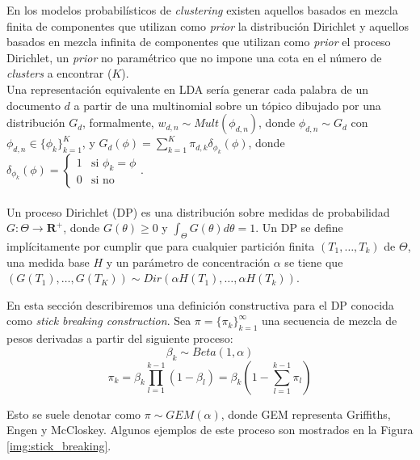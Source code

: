 \documentclass[letterpaper,12pt,oneside]{book} %
\begin{document}
En los modelos probabilísticos de \textit{clustering} existen aquellos basados en mezcla finita de componentes que utilizan como \textit{prior} la distribución Dirichlet y aquellos basados en mezcla infinita de componentes que utilizan como \textit{prior} el proceso Dirichlet, un \textit{prior} no paramétrico que no impone una cota en el número de \textit{clusters} a encontrar ($K$).\\

Una representación equivalente en LDA sería generar cada palabra de un documento $d$ a partir de una multinomial sobre un tópico dibujado por una distribución $G_{d}$, formalmente, $w_{d,n}\sim Mult(\phi_{d,n})$, donde $\phi_{d,n} \sim G_{d}$ con $\phi_{d,n} \in \{\phi_{k}\}_{k=1}^{K}$, y $G_{d}(\phi)=\sum_{k=1}^{K}\pi_{d, k}\delta_{\phi_{k}}(\phi)$, donde $\delta_{\phi_{k}}(\phi) = \begin{cases}
    1 & \text{si $\phi_{k}=\phi$}  \\
    0 & \text{si no}
  \end{cases}$.\\\\

Un proceso Dirichlet (DP) es una distribución sobre medidas de probabilidad $G: \Theta \rightarrow \mathbf{R}^{+}$, donde $G(\theta)\geq 0$ y $\int_{\Theta}G(\theta)d\theta=1$. Un DP se define implícitamente por cumplir que para cualquier partición finita $(T_{1}, \ldots, T_{k})$ de $\Theta$, una medida base $H$ y un parámetro de concentración $\alpha$ se  tiene que $(G(T_{1}), \ldots, G(T_{K})) \sim Dir(\alpha H(T_{1}), \ldots, \alpha H(T_{k}))$.

En esta sección describiremos una definición constructiva para el DP conocida como \textit{stick breaking construction}. Sea $\pi=\{\pi_{k}\}_{k=1}^{\infty}$ una secuencia de mezcla de pesos derivadas a partir del siguiente proceso:
\begin{equation}
    \beta_{k}\sim Beta(1, \alpha)
\end{equation}
\begin{equation}
    \pi_{k} = \beta_{k}\prod_{l=1}^{k-1}(1-\beta_{l}) = \beta_{k}(1-\sum_{l=1}^{k-1}\pi_{l})
\end{equation}

Esto se suele denotar como $\pi \sim GEM(\alpha)$, donde GEM representa Griffiths, Engen y McCloskey. Algunos ejemplos de este proceso son mostrados en la Figura \ref{img:stick_breaking}.
\end{document}

